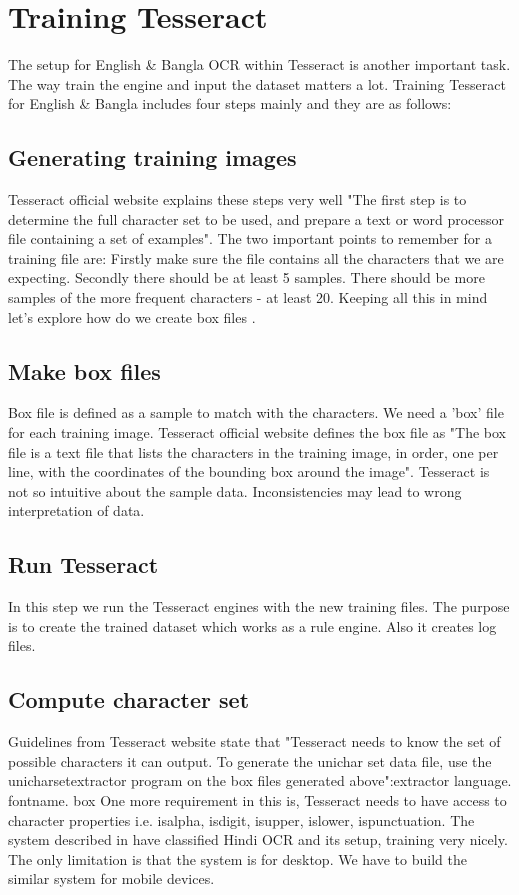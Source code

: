 \section{Training Tesseract}
The setup for English \& Bangla OCR within Tesseract is another important task. The way train the engine and input the dataset matters a lot\cite{TesseractTrain}\citep{hasnat2009open}.
Training Tesseract for English \& Bangla includes four steps mainly and they are as follows:
\subsection{Generating training images}
Tesseract official website explains these steps very well "The first step is to determine the full
character set to be used, and prepare a text or word processor file containing a set of examples". The two important points to remember for a training file are: Firstly make sure the file
contains all the characters that we are expecting. Secondly there should be at least 5 samples.
There should be more samples of the more frequent characters - at least 20. Keeping all this
in mind let's explore how do we create box files \cite{TesseractTrain}.
\subsection{Make box files}
Box file is defined as a sample to match with the characters. We need a 'box' file for each
training image. Tesseract official website defines the box file as "The box file is a text file that
lists the characters in the training image, in order, one per line, with the coordinates of the
bounding box around the image". Tesseract is not so intuitive about the sample data.
Inconsistencies may lead to wrong interpretation of data\cite{TesseractTrain}.
\subsection{Run Tesseract}
In this step we run the Tesseract engines with the new training files. The purpose is to create the
trained dataset which works as a rule engine. Also it creates log files\cite{TesseractTrain}.
\subsection{Compute character set} 
Guidelines from Tesseract website state that "Tesseract needs to know the set of possible characters it can output. To generate the unichar set data file, use the unicharset\textunderscore extractor program on the box files generated above":extractor language. fontname. box 
One more requirement in this is, Tesseract needs to have access to character properties i.e.
isalpha, isdigit, isupper, islower, ispunctuation.
The system described in have classified Hindi OCR and its setup, training very nicely.
The only limitation is that the system is for desktop. We have to build the similar system for
mobile devices.\cite{TesseractTrain}
